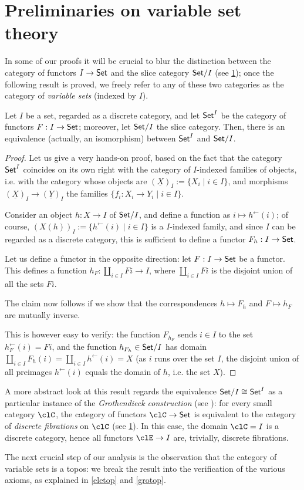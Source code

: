\section{Preliminaries on variable set theory}
In some of our proofs it will be crucial to blur the distinction between the category of functors $I \to \mathsf{Set}$ and the slice category $\mathsf{Set}/I$ (see \ref{}); once the following result is proved, we freely refer to any of these two categories as the category of \emph{variable sets} (indexed by $I$).
\begin{proposition}
	Let $I$ be a set, regarded as a discrete category, and let $\mathsf{Set}^I$ be the category of functors $F : I \to \mathsf{Set}$; moreover, let $\mathsf{Set}/I$ the slice category. Then, there is an equivalence (actually, an isomorphism) between $\mathsf{Set}^I$ and $\mathsf{Set}/I$.
\end{proposition}
\begin{proof}
	Let us give a very hands-on proof, based on the fact that the category $\mathsf{Set}^I$ coincides on its own right with the category of $I$-indexed families of objects, i.e. with the category whose objects are $(\underline X)_I := \{X_i\mid i\in I\}$, and morphisms $(\underline X)_I\to (\underline Y)_I$ the families $\{f_i : X_i \to Y_i\mid i \in I\}$.

	Consider an object $h : X\to I$ of $\mathsf{Set}/I$, and define a function as $i\mapsto h^\leftarrow(i)$; of course, $(X(h))_I := \{h^\leftarrow(i) \mid i \in I\}$ is a $I$-indexed family, and since $I$ can be regarded as a discrete category, this is sufficient to define a functor $F_h : I \to \mathsf{Set}$.

	Let us define a functor in the opposite direction: let $F : I \to \mathsf{Set}$ be a functor. This defines a function $h_F : \coprod_{i\in I}Fi \to I$, where $\coprod_{i\in I} Fi$ is the disjoint union of all the sets $Fi$.

	The claim now follows if we show that the correspondences $h\mapsto F_h$ and $F\mapsto h_F$ are mutually inverse.

	This is however easy to verify: the function $F_{h_F}$ sends $i\in I$ to the set $h_F^\leftarrow(i)=Fi$, and the function $h_{F_h} \in \mathsf{Set}/I$ has domain $\coprod_{i\in I}F_h(i) = \coprod_{i\in I}h^\leftarrow(i)=X$ (as $i$ runs over the set $I$, the disjoint union of all preimages $h^\leftarrow(i)$ equals the domain of $h$, i.e. the set $X$).
\end{proof}
\begin{remark}
	A more abstract look at this result regards the equivalence $\mathsf{Set}/I\cong \mathsf{Set}^I$ as a particular instance of the \emph{Grothendieck construction} (see \cite[1.1]{Leinster2004}): for every small category $\clC$, the category of functors $\clC\to\Set$ is equivalent to the category of \emph{discrete fibrations} on $\clC$ (see \ref{}). In this case, the domain $\clC=I$ is a discrete category, hence all functors $\clE \to I$ are, trivially, discrete fibrations.
\end{remark}
The next crucial step of our analysis is the observation that the category of variable sets is a topos: we break the result into the verification of the various axioms, as explained in \ref{eletop} and \ref{grotop}.

